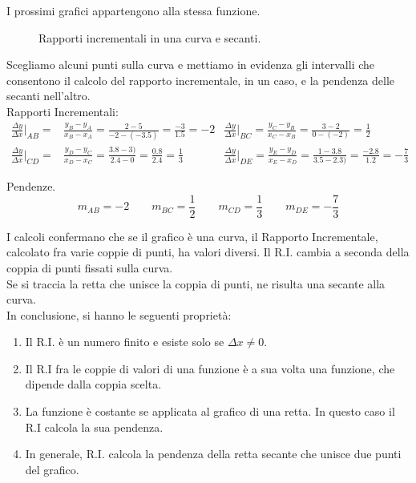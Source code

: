 \begin{esempio}
I prossimi grafici appartengono alla stessa funzione.

\begin{figure}[h]
\begin{inaccessibleblock}
 \begin{minipage}[]{.45\textwidth}
 \curvacubica
 \end{minipage} 
 \hfill
 \begin{minipage}[]{.55\textwidth}
  \secanticubica
 \end{minipage}
\end{inaccessibleblock}
\caption{Rapporti incrementali in una curva e secanti.} 
\label{}
\end{figure}

Scegliamo alcuni punti sulla curva e mettiamo in evidenza gli intervalli che
consentono il calcolo del rapporto incrementale, in un caso, e la pendenza 
delle secanti nell'altro.\\
Rapporti Incrementali:
\begin{align*}
  \frac{\Delta y}{\Delta x}\bigg\lvert_{AB}= &\frac{y_B-y_A}{x_B-x_A}=
    \frac{2-5}{-2-(-3.5)}=\frac{-3}{1.5}=-2 &
  \frac{\Delta y}{\Delta x}\bigg\rvert_{BC}=\frac{y_C-y_B}{x_C-x_B}=
  \frac{3-2}{0-(-2)}=\frac{1}{2}\\
  \frac{\Delta y}{\Delta x}\bigg\lvert_{CD}= &\frac{y_D-y_C}{x_D-x_C}=
  \frac{3.8-3)}{2.4-0}=\frac{0.8}{2.4}=\frac{1}{3} &
  \frac{\Delta y}{\Delta x}\bigg\rvert_{DE}=\frac{y_E-y_D}{x_E-x_D}=
  \frac{1-3.8}{3.5-2.3)}=\frac{-2.8}{1.2}=-\frac{7}{3}
\end{align*}

Pendenze.\\
$$  m_{AB}=-2 \qquad m_{BC}=\frac{1}{2}\qquad m_{CD}=\frac{1}{3}\qquad  
m_{DE}=-\frac{7}{3}$$
\end{esempio}

I calcoli confermano che se il grafico è una curva, il Rapporto 
Incrementale, 
calcolato fra varie coppie di punti, ha valori diversi. 
Il R.I. cambia a seconda della coppia di punti fissati sulla curva.\\
Se si traccia la retta che unisce la coppia di punti, ne risulta una secante
alla curva.\\
In conclusione, si hanno le seguenti proprietà:

\begin{enumerate}[noitemsep]
\item Il R.I. è un numero finito e esiste solo se $\Delta x\ne 0$.
\item Il R.I fra le coppie di valori di una funzione è 
 a sua volta una funzione, che dipende dalla coppia scelta. 
 \item La funzione è costante se applicata al grafico di una retta. In 
questo 
 caso il R.I calcola  la sua pendenza.
\item  In generale, R.I. calcola la pendenza della retta secante che unisce 
due punti del grafico.
\end{enumerate}


